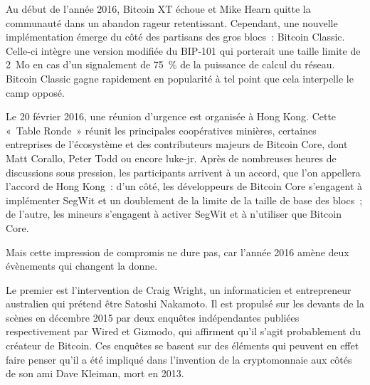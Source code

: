 Au début de l'année 2016, Bitcoin XT échoue et Mike Hearn quitte la communauté dans un abandon rageur retentissant. Cependant, une nouvelle implémentation émerge du côté des partisans des gros blocs~: Bitcoin Classic. Celle-ci intègre une version modifiée du BIP-101 qui porterait une taille limite de 2~Mo en cas d'un signalement de 75~\% de la puissance de calcul du réseau. Bitcoin Classic gagne rapidement en popularité à tel point que cela interpelle le camp opposé.

Le 20 février 2016, une réunion d'urgence est organisée à Hong Kong. Cette «~Table Ronde~» réunit les principales coopératives minières, certaines entreprises de l'écosystème et des contributeurs majeurs de Bitcoin Core, dont Matt Corallo, Peter Todd ou encore luke-jr. Après de nombreuses heures de discussions sous pression, les participants arrivent à un accord, que l'on appellera l'accord de Hong Kong~: d'un côté, les développeurs de Bitcoin Core s'engagent à implémenter SegWit et un doublement de la limite de la taille de base des blocs~; de l'autre, les mineurs s'engagent à activer SegWit et à n'utiliser que Bitcoin Core.

Mais cette impression de compromis ne dure pas, car l'année 2016 amène deux évènements qui changent la donne.

Le premier est l'intervention de Craig Wright, un informaticien et entrepreneur australien qui prétend être Satoshi Nakamoto. Il est propulsé sur les devants de la scènes en décembre 2015 par deux enquêtes indépendantes publiées respectivement par Wired et Gizmodo, qui affirment qu'il s'agit probablement du créateur de Bitcoin. Ces enquêtes se basent sur des éléments qui peuvent en effet faire penser qu'il a été impliqué dans l'invention de la cryptomonnaie aux côtés de son ami Dave Kleiman, mort en 2013.

